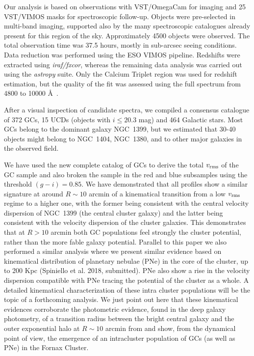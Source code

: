 \documentclass[useAMS,usenatbib]{mn2e}
\begin{document}
Our analysis is based on observations with VST/OmegaCam for imaging and 25 
VST/VIMOS masks for spectroscopic follow-up. Objects were pre-selected in 
multi-band imaging, supported also by the many spectroscopic catalogues already 
present for this region of the sky.  Approximately 4500 objects were observed. 
The total observation time was 37.5 hours, mostly in sub-arcsec seeing 
conditions. Data reduction was performed using the ESO VIMOS pipeline. 
Redshifts were extracted using {\it iraf/fxcor}, whereas the remaining data analysis 
was carried out using the {\it astropy} suite. Only the Calcium Triplet region was 
used for redshift estimation, but the quality of the fit was assessed using the 
full spectrum from 4800 to 10000 \AA\ .

After a visual inspection of candidate spectra, we compiled a consensus 
catalogue of 372 GCs, 15 UCDs (objects with $i \le 20.3$ mag) and 464 Galactic 
stars. Most GCs belong to the dominant galaxy NGC~1399, but we estimated that 
30-40 objects might belong to NGC~1404, NGC~1380, and to other major galaxies 
in the observed field.

We have used the new complete catalog of GCs to derive the total  $v_{\rm rms}$ 
of the GC sample and also broken the sample in the red and blue subsamples using
the threshold $(g - i) = 0.85$.
We have demonstrated that all profiles show a similar signature at around 
$R\sim10$ arcmin of a kinematical transition from a low $v_{\rm rms}$ regime to a 
higher one, with the former being consistent with the central velocity 
dispersion of NGC~1399 (the central cluster galaxy) and the latter being 
consistent with the velocity dispersion of the cluster galaxies. This 
demonstrates that at $R>10$ arcmin both GC populations feel strongly the cluster 
potential, rather than the more fable galaxy potential. Parallel to this paper 
we also performed a similar analysis where we present similar evidence based on 
kinematical distribution of planetary nebulae (PNe) in the core of the cluster, 
up to 200 Kpc (Spiniello et al. 2018, submitted). PNe also show a rise in the 
velocity dispersion compatible with PNe tracing the potential of the cluster as 
a whole. A detailed kinematical characterization of these intra cluster populations will 
be the topic of a forthcoming analysis. We just point out here that these 
kinematical evidences corroborate the photometric evidence, found in the deep 
galaxy photometry, of a transition radius between the bright central galaxy and 
the outer exponential halo at $R\sim10$ arcmin from \citet{Iodice16} and 
show, from the dynamical point of view, the emergence of an intracluster 
population of GCs (as well as PNe) in the Fornax Cluster.
\end{document}
